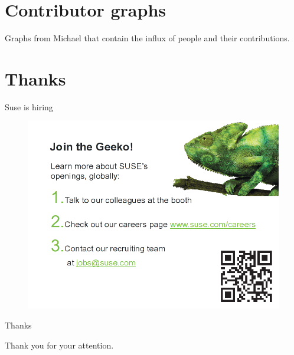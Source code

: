 \documentclass{beamer}
\begin{document}
\section{Contributor graphs}

Graphs from Michael that contain the influx of people and their contributions.

\section{Thanks}

\begin{frame}{Suse is hiring}
	\begin{figure}
	\includegraphics[width= 0.8\linewidth]{suse_hiring.png}
	\end{figure}
\end{frame}

\begin{frame}{Thanks}
	\begin{center}
	Thank you for your attention.
	\end{center}
\end{frame}
\end{document}
